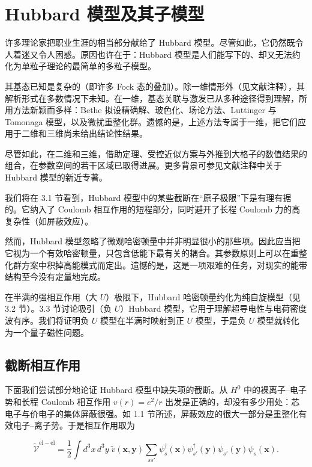 \chapter{Hubbard 模型及其子模型}

许多理论家把职业生涯的相当部分献给了 Hubbard 模型。尽管如此，它仍然既令人着迷又令人困惑。原因也许在于：Hubbard 模型是人们能写下的、却又无法约化为单粒子理论的最简单的多粒子模型。

其基态已知是复杂的（即许多 Fock 态的叠加）。除一维情形外（见文献注释），其解析形式在多数情况下未知。在一维，基态关联与激发已从多种途径得到理解，所用方法新颖而多样：Bethe 拟设精确解、玻色化、场论方法、Luttinger 与 Tomonaga 模型，以及微扰重整化群。遗憾的是，上述方法专属于一维，把它们应用于二维和三维尚未给出结论性结果。

尽管如此，在二维和三维，借助定理、受控近似方案与外推到大格子的数值结果的组合，在参数空间的若干区域已取得进展。更多背景可参见文献注释中关于 Hubbard 模型的新近专著。

我们将在 3.1 节看到，Hubbard 模型中的某些截断在“原子极限”下是有理有据的。它纳入了 Coulomb 相互作用的短程部分，同时避开了长程 Coulomb 力的高复杂性（如屏蔽效应）。

然而，Hubbard 模型忽略了微观哈密顿量中并非明显很小的那些项。因此应当把它视为一个有效哈密顿量，只包含低能下最有关的耦合。其参数原则上可以在重整化群方案中积掉高能模式而定出。遗憾的是，这是一项艰难的任务，对现实的能带结构至今没有定量地完成。

在半满的强相互作用（大 $U$）极限下，Hubbard 哈密顿量约化为纯自旋模型（见 3.2 节）。3.3 节讨论吸引（负 $U$）Hubbard 模型，它用于理解超导电性与电荷密度波有序。我们将证明负 $U$ 模型在半满时映射到正 $U$ 模型，于是负 $U$ 模型就转化为一个量子磁性问题。

\section{截断相互作用}

下面我们尝试部分地论证 Hubbard 模型中缺失项的截断。从 $H^{0}$ 中的裸离子--电子势和长程 Coulomb 相互作用 $v(r) = e^{2}/r$ 出发是正确的，却没有多少用处：芯电子与价电子的集体屏蔽很强。如 1.1 节所述，屏蔽效应的很大一部分是重整化有效电子--离子势。于是相互作用取为

\begin{equation*}
\tilde {\mathcal {V}} ^ {\mathrm{el-el}} = \frac {1}{2} \int d ^ {3} x \, d ^ {3} y \; \tilde {v} (\mathbf {x}, \mathbf {y}) \sum_ {ss'} \psi_ {s} ^ {\dagger} (\mathbf {x}) \psi_ {s '} ^ {\dagger} (\mathbf {y}) \psi_ {s '} (\mathbf {y}) \psi_ {s} (\mathbf {x}).
\tag{3.1}
\end{equation*}

